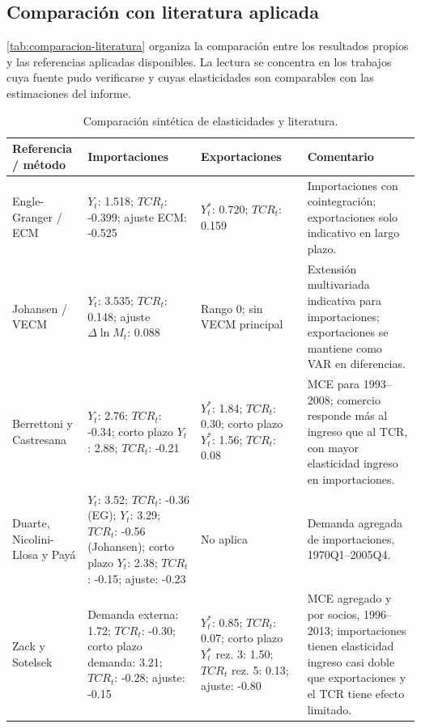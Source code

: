 \documentclass[11pt,a4paper]{article}
\begin{document}
	\subsection{Comparación con literatura aplicada}
	\label{subsec:comparacion-literatura}
	
\autoref{tab:comparacion-literatura} organiza la comparación entre los
resultados propios y las referencias aplicadas disponibles. La lectura se
concentra en los trabajos cuya fuente pudo verificarse y cuyas elasticidades
son comparables con las estimaciones del informe.

\begin{table}[H]
\centering
\caption{Comparación sintética de elasticidades y literatura.}
\label{tab:comparacion-literatura}
\scriptsize
\setlength{\tabcolsep}{4pt}
\begin{tabular}{p{2.8cm}p{3.2cm}p{3.2cm}p{4.1cm}}
\toprule
Referencia / método & Importaciones & Exportaciones & Comentario \\
\midrule
Engle-Granger / ECM & \(Y_t\): 1.518; \(TCR_t\): -0.399; ajuste ECM: -0.525 & \(Y_t^*\): 0.720; \(TCR_t\): 0.159 & Importaciones con cointegración; exportaciones solo indicativo en largo plazo. \\
Johansen / VECM & \(Y_t\): 3.535; \(TCR_t\): 0.148; ajuste \(\Delta \ln M_t\): 0.088 & Rango 0; sin VECM principal & Extensión multivariada indicativa para importaciones; exportaciones se mantiene como VAR en diferencias. \\
Berrettoni y Castresana \cite{berrettoni_castresana_2008} & \(Y_t\): 2.76; \(TCR_t\): -0.34; corto plazo \(Y_t\): 2.88; \(TCR_t\): -0.21 & \(Y_t^*\): 1.84; \(TCR_t\): 0.30; corto plazo \(Y_t^*\): 1.56; \(TCR_t\): 0.08 & MCE para 1993--2008; comercio responde más al ingreso que al TCR, con mayor elasticidad ingreso en importaciones. \\
Duarte, Nicolini-Llosa y Payá \cite{duarte_nicolini_llosa_paya_2007} & \(Y_t\): 3.52; \(TCR_t\): -0.36 (EG); \(Y_t\): 3.29; \(TCR_t\): -0.56 (Johansen); corto plazo \(Y_t\): 2.38; \(TCR_t\): -0.15; ajuste: -0.23 & No aplica & Demanda agregada de importaciones, 1970Q1--2005Q4. \\
Zack y Sotelsek \cite{zack_sotelsek_2016} & Demanda externa: 1.72; \(TCR_t\): -0.30; corto plazo demanda: 3.21; \(TCR_t\): -0.28; ajuste: -0.15 & \(Y_t^*\): 0.85; \(TCR_t\): 0.07; corto plazo \(Y_t^*\) rez. 3: 1.50; \(TCR_t\) rez. 5: 0.13; ajuste: -0.80 & MCE agregado y por socios, 1996--2013; importaciones tienen elasticidad ingreso casi doble que exportaciones y el TCR tiene efecto limitado. \\

\end{tabular}
\end{table}
\end{document}
